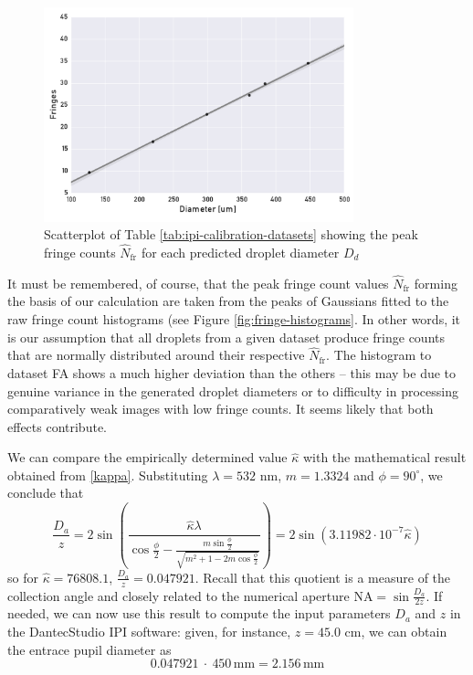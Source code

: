 \documentclass[10pt]{book}
\begin{document}
\begin{figure}[h!]
    \centering
    \includegraphics[width=0.8\textwidth]{img/fringe_regression.pdf}
    \caption{Scatterplot of Table \ref{tab:ipi-calibration-datasets} showing the peak fringe counts $\hat{N}_\text{fr}$ for each predicted droplet diameter $D_d$}
    \label{fig:fringe-regression}
\end{figure}
It must be remembered, of course, that the peak fringe count values
$\hat{N}_\text{fr}$ forming the basis of our calculation are taken from the
peaks of Gaussians fitted to the raw fringe count histograms (see Figure
\ref{fig:fringe-histograms}. In other words, it is our assumption that all
droplets from a given dataset produce fringe counts that are normally
distributed around their respective $\hat{N}_\text{fr}$. The histogram to
dataset FA shows a much higher deviation than the others -- this may be due to
genuine variance in the generated droplet diameters or to difficulty in
processing comparatively weak images with low fringe counts. It seems likely
that both effects contribute.

We can compare the empirically determined value $\hat{\kappa}$ with the
mathematical result obtained from \eqref{kappa}. Substituting $\lambda = 532$
nm, $m = 1.3324$ and $\phi = 90^\circ$, we conclude that
\begin{equation}
    \frac{D_a}{z} = 2 \sin \left( \frac{\hat{\kappa} \lambda}{\cos
    \frac{\phi}{2} - \frac{ m \sin \frac{\phi}{2}}{\sqrt{m^2 + 1 - 2m \cos
    \frac{\phi}{2}}}} \right) = 2\sin (3.11982 \cdot 10^{-7} \hat{\kappa})
\end{equation}
so for $\hat{\kappa} = 76808.1$, $\frac{D_a}{z} = 0.047921$. Recall that this
quotient is a measure of the collection angle and closely related to the
numerical aperture NA$=\sin \frac{D_a}{2z}$. If needed, we can now use this
result to compute the input parameters $D_a$ and $z$ in the DantecStudio IPI
software: given, for instance, $z = 45.0$ cm, we can obtain the entrace pupil
diameter as
\begin{equation}
    0.047921~\cdot~450\,\mathrm{mm} = 2.156\,\mathrm{mm}
\end{equation}
\end{document}
